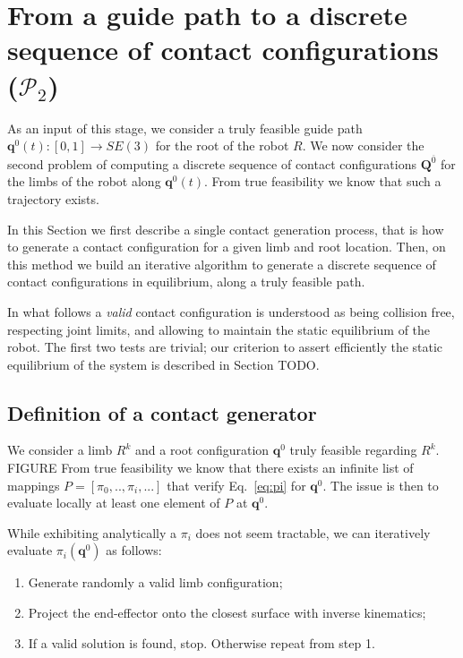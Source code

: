 \section{From a guide path to a discrete sequence of contact configurations ($\mathcal{P}_2$)}
\label{sec:contact}
As an input of this stage, we consider a truly feasible guide path $\mathbf{q}^0(t) : [0,1] \longrightarrow SE(3)$ for the root of the robot $R$. We now consider the second problem of computing a discrete sequence of contact configurations $\mathbf{Q}^{\overline{0}}$ for the limbs of the robot along $\mathbf{q}^0(t)$. From true feasibility we know that such a trajectory exists. 

In this Section we first describe a single contact generation process, that is how to generate a contact configuration for a given limb 
and root location.
Then, on this method we build an iterative algorithm to generate a discrete sequence of contact configurations in equilibrium, along a truly feasible path.

In what follows a \textit{valid} contact configuration is understood as being collision free, respecting joint limits, and allowing to maintain the static equilibrium
of the robot. The first two tests are trivial; our criterion to assert efficiently the static equilibrium of the system
is described in Section TODO.

\subsection{Definition of a contact generator}
\label{sec:single_contact}
We consider a limb $R^k$  and a root configuration $\mathbf{q}^0$ truly feasible regarding $R^k$. FIGURE
From true feasibility we know that there exists an infinite list of mappings $P = [\pi_0,..,\pi_i, ...]$ that verify Eq.~\eqref{eq:pi} for $\mathbf{q}^0$.
The issue is then to evaluate locally at least one element of $P$ at $\mathbf{q}^0$.

While exhibiting analytically a $\pi_i$ does not seem tractable, we can iteratively evaluate $\pi_i(\mathbf{q}^0)$ as follows:
\begin{enumerate}
\item Generate randomly a valid limb configuration;
\item Project the end-effector onto the closest surface with inverse kinematics;
\item If a valid solution is found, stop. Otherwise repeat from step 1.
\end{enumerate}


